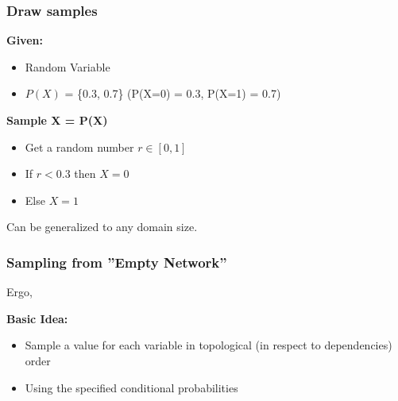 \documentclass[
../EiKI_Summary.tex,
]
{subfiles}
\begin{document}
\subsubsection*{Draw samples}
\textbf{Given:}
\begin{itemize}
    \item Random Variable 
    \item $P(X)$ = \{0.3, 0.7\} (P(X=0) = 0.3, P(X=1) = 0.7)
\end{itemize}

\textbf{Sample X = P(X)}
\begin{itemize}
    \item Get a random number $r \in [0,1]$
    \item If $r < 0.3$ then $X = 0$
    \item Else $X = 1$ 
\end{itemize}

Can be generalized to any domain size.

\subsubsection*{Sampling from ''Empty Network''}
Ergo, 

\textbf{Basic Idea:}
\begin{itemize}
    \item Sample a value for each variable in topological (in respect to dependencies) order
    \item Using the specified conditional probabilities
\end{itemize}

\begin{codebox*}
    \begin{algorithm}[H]

    \end{algorithm}
\end{codebox*}
\end{document}

